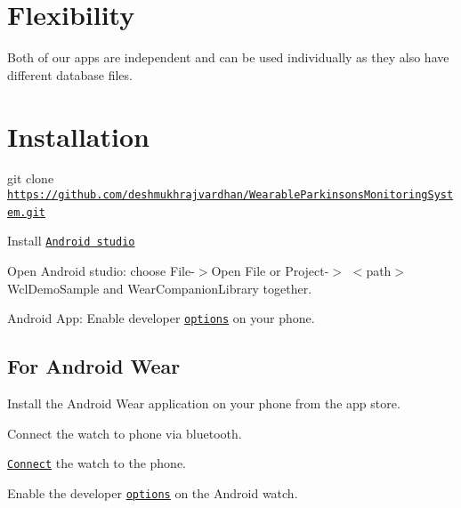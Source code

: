\section*{Flexibility}

Both of our apps are independent and can be used individually as they also have different database files. ~\newline


\section*{Installation}


\begin{DoxyEnumerate}
\item {\ttfamily git clone \href{https://github.com/deshmukhrajvardhan/WearableParkinsonsMonitoringSystem.git}{\tt https\+://github.\+com/deshmukhrajvardhan/\+Wearable\+Parkinsons\+Monitoring\+System.\+git}} ~\newline

\item Install \href{https://developer.android.com/studio/index.html}{\tt Android studio} ~\newline

\item Open Android studio\+: choose {\ttfamily File-\/$>$Open File or Project-\/$>$} $<$path$>$ {\ttfamily Wcl\+Demo\+Sample} and {\ttfamily Wear\+Companion\+Library} together. ~\newline

\item Android App\+: Enable developer \href{https://developer.android.com/studio/run/device.html}{\tt options} on your phone. ~\newline

\end{DoxyEnumerate}

\subsection*{For Android Wear}


\begin{DoxyEnumerate}
\item Install the {\ttfamily Android Wear} application on your phone from the app store. ~\newline

\item Connect the watch to phone via bluetooth. ~\newline

\item \href{https://forum.xda-developers.com/moto-360/general/guide-install-apk-moto-360-t3028067}{\tt Connect} the watch to the phone. ~\newline

\item Enable the developer \href{https://forums.androidcentral.com/moto-360/436873-how-enable-developer-options.html}{\tt options} on the Android watch. ~\newline

\end{DoxyEnumerate}

